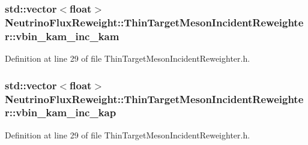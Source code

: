 \hypertarget{class_neutrino_flux_reweight_1_1_thin_target_meson_incident_reweighter_a3cd983d528f4fd3603fef04084751df3}{
\subsubsection[{vbin\-\_\-kam\-\_\-inc\-\_\-kam}]{\setlength{\rightskip}{0pt plus 5cm}std\-::vector$<$float$>$ Neutrino\-Flux\-Reweight\-::\-Thin\-Target\-Meson\-Incident\-Reweighter\-::vbin\-\_\-kam\-\_\-inc\-\_\-kam}}\label{class_neutrino_flux_reweight_1_1_thin_target_meson_incident_reweighter_a3cd983d528f4fd3603fef04084751df3}


Definition at line 29 of file Thin\-Target\-Meson\-Incident\-Reweighter.\-h.

\hypertarget{class_neutrino_flux_reweight_1_1_thin_target_meson_incident_reweighter_a5fdcae1a81d4af5da9972ec67395a113}{
\subsubsection[{vbin\-\_\-kam\-\_\-inc\-\_\-kap}]{\setlength{\rightskip}{0pt plus 5cm}std\-::vector$<$float$>$ Neutrino\-Flux\-Reweight\-::\-Thin\-Target\-Meson\-Incident\-Reweighter\-::vbin\-\_\-kam\-\_\-inc\-\_\-kap}}\label{class_neutrino_flux_reweight_1_1_thin_target_meson_incident_reweighter_a5fdcae1a81d4af5da9972ec67395a113}


Definition at line 29 of file Thin\-Target\-Meson\-Incident\-Reweighter.\-h.

